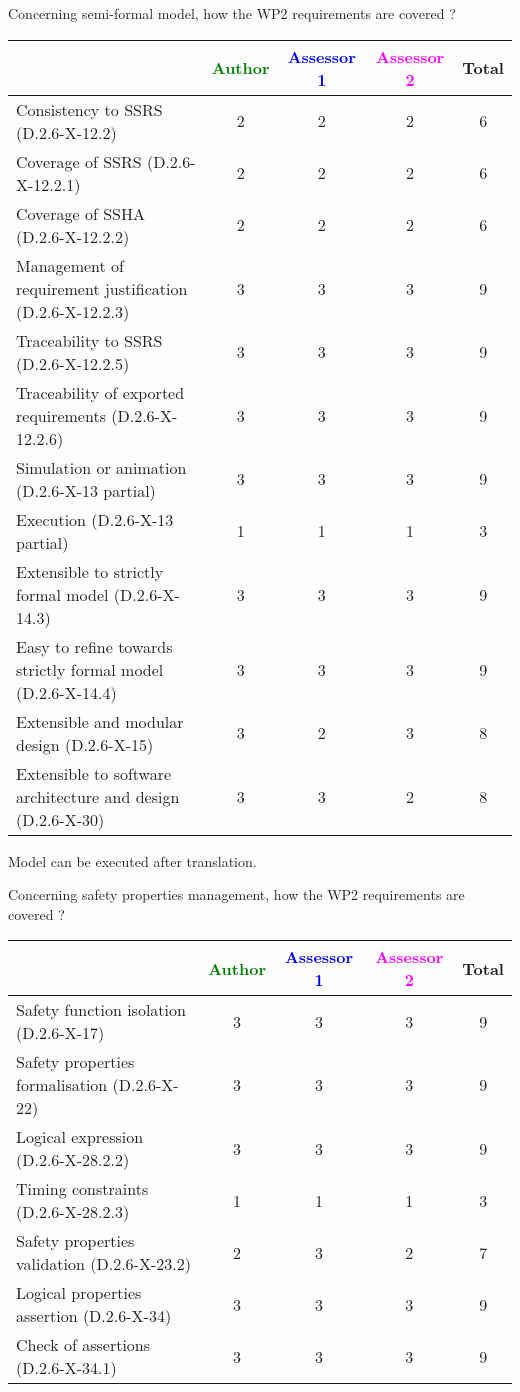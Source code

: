 Concerning semi-formal model, how the WP2 requirements are covered ?

\begin{tabular}{|l | c | c | c | c|}
\hline
& \textcolor{green}{Author} & \textcolor{blue}{Assessor 1} & \textcolor{magenta}{Assessor 2} & Total \\
\hline 
Consistency to SSRS (D.2.6-X-12.2) & 2 & 2 & 2 & 6 \\
\hline
Coverage of SSRS (D.2.6-X-12.2.1)  & 2 & 2 & 2 & 6 \\
\hline
Coverage of SSHA (D.2.6-X-12.2.2)  & 2 & 2 & 2 & 6 \\
\hline
Management of requirement justification (D.2.6-X-12.2.3)  & 3 & 3 & 3 & 9  \\
\hline
Traceability to  SSRS (D.2.6-X-12.2.5)  & 3 & 3 & 3 & 9 \\
\hline
Traceability of exported requirements (D.2.6-X-12.2.6)  & 3 & 3 & 3 & 9 \\
\hline
Simulation or animation (D.2.6-X-13 partial)  & 3 & 3 & 3 & 9 \\
\hline
Execution (D.2.6-X-13 partial)  & 1 & 1 & 1 & 3 \\
\hline
Extensible to strictly formal model (D.2.6-X-14.3) & 3 & 3 & 3 &  9 \\
\hline
Easy to  refine towards strictly formal model (D.2.6-X-14.4) & 3 & 3 & 3 & 9 \\
\hline
Extensible and modular design (D.2.6-X-15)  & 3 & 2 & 3 & 8  \\
\hline
Extensible to software architecture and design (D.2.6-X-30)   & 3 & 3 & 2 & 8 \\
\hline
\end{tabular}


\begin{author_comment}
Model can be executed after translation.
\end{author_comment}

Concerning safety properties management, how the WP2 requirements are covered ?

\begin{tabular}{|l | c | c | c | c|}
\hline
& \textcolor{green}{Author} & \textcolor{blue}{Assessor 1} & \textcolor{magenta}{Assessor 2} & Total \\
\hline 
Safety function isolation (D.2.6-X-17)  & 3 & 3 & 3 & 9 \\
\hline 
Safety properties formalisation (D.2.6-X-22)  & 3 & 3 & 3 & 9 \\
\hline
Logical expression (D.2.6-X-28.2.2)  & 3 & 3 & 3 & 9 \\
\hline
Timing constraints (D.2.6-X-28.2.3)  & 1 & 1 & 1 & 3 \\
\hline
Safety properties validation (D.2.6-X-23.2)  & 2 & 3 & 2 & 7 \\
\hline
Logical properties assertion (D.2.6-X-34)  & 3 & 3 & 3 & 9 \\
\hline
Check  of assertions (D.2.6-X-34.1)  & 3 & 3 & 3 & 9 \\
\hline
\end{tabular}


